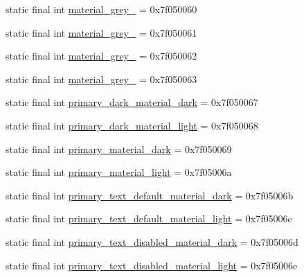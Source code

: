 \begin{DoxyCompactItemize}
\item 
static final int \mbox{\hyperlink{classcom_1_1google_1_1android_1_1gms_1_1R_1_1color_ac37c4fa30d3fe3fb095274b4ea53222b}{material\+\_\+grey\+\_}} = 0x7f050060
\item 
static final int \mbox{\hyperlink{classcom_1_1google_1_1android_1_1gms_1_1R_1_1color_ad2fda1f44a0645ff5e5a596b80d1c111}{material\+\_\+grey\+\_}} = 0x7f050061
\item 
static final int \mbox{\hyperlink{classcom_1_1google_1_1android_1_1gms_1_1R_1_1color_a422789755412b88902311074df3a4c44}{material\+\_\+grey\+\_}} = 0x7f050062
\item 
static final int \mbox{\hyperlink{classcom_1_1google_1_1android_1_1gms_1_1R_1_1color_ad898c5a72f153bb1d25bf30262273b92}{material\+\_\+grey\+\_}} = 0x7f050063
\item 
static final int \mbox{\hyperlink{classcom_1_1google_1_1android_1_1gms_1_1R_1_1color_a4b34fb6b6fa23f7b658859ddab01b009}{primary\+\_\+dark\+\_\+material\+\_\+dark}} = 0x7f050067
\item 
static final int \mbox{\hyperlink{classcom_1_1google_1_1android_1_1gms_1_1R_1_1color_a5c4b93e84b69cb8e2b409df94e0725f4}{primary\+\_\+dark\+\_\+material\+\_\+light}} = 0x7f050068
\item 
static final int \mbox{\hyperlink{classcom_1_1google_1_1android_1_1gms_1_1R_1_1color_ada5c4af3af2bd05b0c4437f0db287413}{primary\+\_\+material\+\_\+dark}} = 0x7f050069
\item 
static final int \mbox{\hyperlink{classcom_1_1google_1_1android_1_1gms_1_1R_1_1color_a3938d73a6d42ad870fe52db7e00ff6e7}{primary\+\_\+material\+\_\+light}} = 0x7f05006a
\item 
static final int \mbox{\hyperlink{classcom_1_1google_1_1android_1_1gms_1_1R_1_1color_a7154a8dcfe3f136d541b78113794bf69}{primary\+\_\+text\+\_\+default\+\_\+material\+\_\+dark}} = 0x7f05006b
\item 
static final int \mbox{\hyperlink{classcom_1_1google_1_1android_1_1gms_1_1R_1_1color_af01e47bdb4cb8340885529777d88546c}{primary\+\_\+text\+\_\+default\+\_\+material\+\_\+light}} = 0x7f05006c
\item 
static final int \mbox{\hyperlink{classcom_1_1google_1_1android_1_1gms_1_1R_1_1color_a04a2da45d37957e3dd1511b035774076}{primary\+\_\+text\+\_\+disabled\+\_\+material\+\_\+dark}} = 0x7f05006d
\item 
static final int \mbox{\hyperlink{classcom_1_1google_1_1android_1_1gms_1_1R_1_1color_a2289d836cae6b509ee0dcee95a6b10b6}{primary\+\_\+text\+\_\+disabled\+\_\+material\+\_\+light}} = 0x7f05006e

\end{DoxyCompactItemize}
